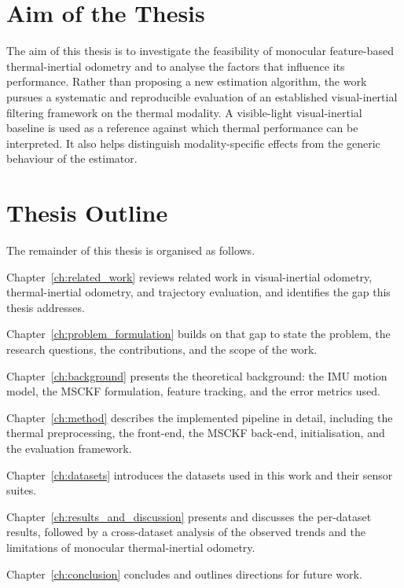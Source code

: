 \section{Aim of the Thesis}
\label{sec:aim}

The aim of this thesis is to investigate the feasibility of monocular feature-based thermal-inertial odometry and to analyse the factors that influence its performance. Rather than proposing a new estimation algorithm, the work pursues a systematic and reproducible evaluation of an established visual-inertial filtering framework on the thermal modality.
A visible-light visual-inertial baseline is used as a reference against which thermal performance can be interpreted. It also helps distinguish modality-specific effects from the generic behaviour of the estimator.

\section{Thesis Outline}
\label{sec:outline}

The remainder of this thesis is organised as follows.

Chapter~\ref{ch:related_work} reviews related work in visual-inertial odometry, thermal-inertial odometry, and trajectory evaluation, and identifies the gap this thesis addresses.

Chapter~\ref{ch:problem_formulation} builds on that gap to state the problem, the research questions, the contributions, and the scope of the work.

Chapter~\ref{ch:background} presents the theoretical background: the IMU motion model, the MSCKF formulation, feature tracking, and the error metrics used.

Chapter~\ref{ch:method} describes the implemented pipeline in detail, including the thermal preprocessing, the front-end, the MSCKF back-end, initialisation, and the evaluation framework.

Chapter~\ref{ch:datasets} introduces the datasets used in this work and their sensor suites.

Chapter~\ref{ch:results_and_discussion} presents and discusses the per-dataset results, followed by a cross-dataset analysis of the observed trends and the limitations of monocular thermal-inertial odometry.

Chapter~\ref{ch:conclusion} concludes and outlines directions for future work.